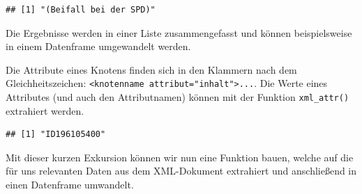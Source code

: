 \documentclass[oneside, 12pt]{scrbook}
\newenvironment{Shaded}{\begin{snugshade}}{\end{snugshade}}
\newcommand{\KeywordTok}[1]{\textcolor[rgb]{0.13,0.29,0.53}{\textbf{#1}}}
\newcommand{\NormalTok}[1]{#1}
\newcommand{\OperatorTok}[1]{\textcolor[rgb]{0.81,0.36,0.00}{\textbf{#1}}}
\newcommand{\StringTok}[1]{\textcolor[rgb]{0.31,0.60,0.02}{#1}}
\theoremstyle{definition}
\theoremstyle{definition}
\theoremstyle{definition}
\theoremstyle{remark}
\begin{document}
\begin{Shaded}
\end{Shaded}

\begin{verbatim}
## [1] "(Beifall bei der SPD)"
\end{verbatim}

Die Ergebnisse werden in einer Liste zusammengefasst und können
beispielsweise in einem Datenframe umgewandelt werden.

Die Attribute eines Knotens finden sich in den Klammern nach dem
Gleichheitszeichen:
\texttt{\textless{}knotenname\ attribut="inhalt"\textgreater{}...}. Die
Werte eines Attributes (und auch den Attributnamen) können mit der
Funktion \texttt{xml\_attr()} extrahiert werden.

\begin{Shaded}
\end{Shaded}

\begin{verbatim}
## [1] "ID196105400"
\end{verbatim}

Mit dieser kurzen Exkursion können wir nun eine Funktion bauen, welche
auf die für uns relevanten Daten aus dem XML-Dokument extrahiert und
anschließend in einen Datenframe umwandelt.
\end{document}
